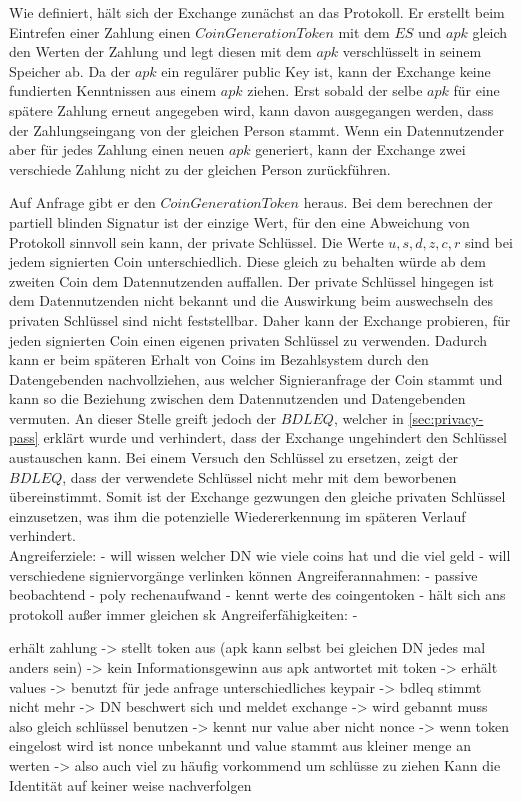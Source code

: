 \documentclass[11pt,a4paper]{scrreprt}
\begin{document}
Wie definiert, hält sich der Exchange zunächst an das Protokoll. Er erstellt beim Eintrefen einer Zahlung einen $CoinGenerationToken$ mit dem $ES$ und $apk$ gleich den Werten der Zahlung und legt diesen mit dem $apk$ verschlüsselt in seinem Speicher ab. Da der $apk$ ein regulärer public Key ist, kann der Exchange keine fundierten Kenntnissen aus einem $apk$ ziehen. Erst sobald der selbe $apk$ für eine spätere Zahlung erneut angegeben wird, kann davon ausgegangen werden, dass der Zahlungseingang von der gleichen Person stammt. Wenn ein Datennutzender aber für jedes Zahlung einen neuen $apk$ generiert, kann der Exchange zwei verschiede Zahlung nicht zu der gleichen Person zurückführen.

Auf Anfrage gibt er den $CoinGenerationToken$ heraus. Bei dem berechnen der partiell blinden Signatur ist der einzige Wert, für den eine Abweichung von Protokoll sinnvoll sein kann, der private Schlüssel. Die Werte $u,s,d,z,c,r$ sind bei jedem signierten Coin unterschiedlich. Diese gleich zu behalten würde ab dem zweiten Coin dem Datennutzenden auffallen. Der private Schlüssel hingegen ist dem Datennutzenden nicht bekannt und die Auswirkung beim auswechseln des privaten Schlüssel sind nicht feststellbar. Daher kann der Exchange probieren, für jeden signierten Coin einen eigenen privaten Schlüssel zu verwenden. Dadurch kann er beim späteren Erhalt von Coins im Bezahlsystem durch den Datengebenden nachvollziehen, aus welcher Signieranfrage der Coin stammt und kann so die Beziehung zwischen dem Datennutzenden und Datengebenden vermuten. An dieser Stelle greift jedoch der $BDLEQ$, welcher in \ref{sec:privacy-pass} erklärt wurde und verhindert, dass der Exchange ungehindert den Schlüssel austauschen kann. Bei einem Versuch den Schlüssel zu ersetzen, zeigt der $BDLEQ$, dass der verwendete Schlüssel nicht mehr mit dem beworbenen übereinstimmt. Somit ist der Exchange gezwungen den gleiche privaten Schlüssel einzusetzen, was ihm die potenzielle Wiedererkennung im späteren Verlauf verhindert.\\




Angreiferziele:
    - will wissen welcher DN wie viele coins hat und die viel geld
    - will verschiedene signiervorgänge verlinken können
Angreiferannahmen:
    - passive beobachtend
    - poly rechenaufwand
    - kennt werte des coingentoken
    - hält sich ans protokoll außer immer gleichen sk
Angreiferfähigkeiten:
    -

erhält zahlung -> stellt token aus (apk kann selbst bei gleichen DN jedes mal anders sein) -> kein Informationsgewinn aus apk
antwortet mit token -> erhält values -> benutzt für jede anfrage unterschiedliches keypair -> bdleq stimmt nicht mehr -> DN beschwert sich und meldet exchange -> wird gebannt
muss also gleich schlüssel benutzen -> kennt nur value aber nicht nonce -> wenn token eingelost wird ist nonce unbekannt und value stammt aus kleiner menge an werten -> also auch viel zu häufig vorkommend um schlüsse zu ziehen
Kann die Identität auf keiner weise nachverfolgen
\end{document}
